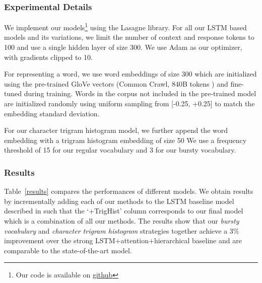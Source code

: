 \documentclass[11pt]{report}
\renewcommand\cite{\citep}	%
\begin{document}
\subsubsection{Experimental Details}
We implement our models\footnote{Our code is available on \href{http://github.com/raosudha89/ubuntu_dialogue}{github} } using the Lasagne \cite{lasagne} library. For all our LSTM based models and its variations, we limit the number of context and response tokens to 100 and use a single hidden layer of size 300. We use Adam \cite{kingma2014adam} as our optimizer, with gradients clipped to 10. 

For representing a word, we use word embeddings of size 300 which are initialized using the pre-trained GloVe vectors (Common Crawl, 840B tokens \cite{pennington2014glove}) and fine-tuned during training. Words in the corpus not included in the pre-trained model are initialized randomly using uniform sampling from [-0.25, +0.25] to match the embedding standard deviation. 

For our character trigram histogram model, we further append the word embedding with a trigram histogram embedding of size 50 %
We use a frequency threshold of 15 for our regular vocabulary and 3 for our bursty vocabulary.  

\subsubsection{Results}
Table~\ref{results} compares the performances of different models. We obtain results by incrementally adding each of our methods to the LSTM baseline model described in \cite{lowe2015ubuntu} such that the `+TrigHist' column corresponds to our final model which is a combination of all our methods.
The results show that our \textit{bursty vocabulary}  and \textit{character trigram histogram} strategies together achieve a 3\% improvement over the strong LSTM+attention+hierarchical baseline and are comparable to the state-of-the-art model. 
\end{document}
